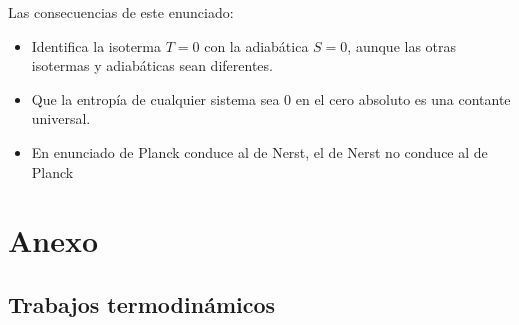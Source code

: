 \documentclass[12pt,a4paper]{article}
\begin{document}
Las consecuencias de este enunciado: 

\begin{itemize}
\item Identifica la isoterma $T=0$ con la adiabática $S=0$, aunque las otras isotermas y adiabáticas sean diferentes.

\item Que la entropía de cualquier sistema sea 0 en el cero absoluto es una contante universal.

\item En enunciado de Planck conduce al de Nerst, el de Nerst no conduce al de Planck
\end{itemize}
\newpage

\section{Anexo}
\subsection{Trabajos termodinámicos}
\end{document}
